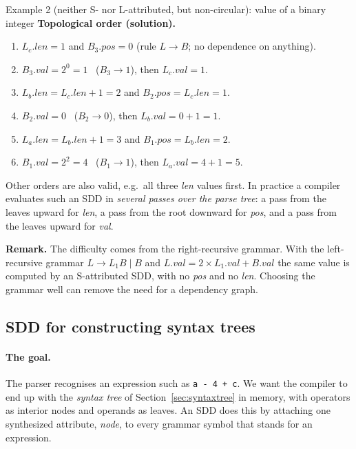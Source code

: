 \documentclass[11pt,a4paper]{article}
\newcommand{\at}[2]{\ensuremath{#1.\mathit{#2}}}
\begin{document}
\begin{examplebox}{Example 2 (neither S- nor L-attributed, but non-circular): value of a binary integer}
\textbf{Topological order (solution).}
\begin{enumerate}[nosep,label=(\arabic*)]
\item $\at{L_c}{len}=1$ and $\at{B_3}{pos}=0$ (rule $L\to B$; no dependence on anything).
\item $\at{B_3}{val}=2^{0}=1$ \ ($B_3\to1$), then $\at{L_c}{val}=1$.
\item $\at{L_b}{len}=\at{L_c}{len}+1=2$ and $\at{B_2}{pos}=\at{L_c}{len}=1$.
\item $\at{B_2}{val}=0$ \ ($B_2\to0$), then $\at{L_b}{val}=0+1=1$.
\item $\at{L_a}{len}=\at{L_b}{len}+1=3$ and $\at{B_1}{pos}=\at{L_b}{len}=2$.
\item $\at{B_1}{val}=2^{2}=4$ \ ($B_1\to1$), then $\at{L_a}{val}=4+1=5$.
\end{enumerate}
Other orders are also valid, e.g.\ all three \textit{len} values first. In practice a compiler evaluates such an SDD in \emph{several passes over the parse tree}: a pass from the leaves upward for \textit{len}, a pass from the root downward for \textit{pos}, and a pass from the leaves upward for \textit{val}.

\textbf{Remark.} The difficulty comes from the right-recursive grammar. With the left-recursive grammar $L\to L_1B\mid B$ and $\at{L}{val}=2\times\at{L_1}{val}+\at{B}{val}$ the same value is computed by an S-attributed SDD, with no \textit{pos} and no \textit{len}. Choosing the grammar well can remove the need for a dependency graph.
\end{examplebox}

\subsection{SDD for constructing syntax trees}
\label{sec:sddtree}

\paragraph{The goal.} The parser recognises an expression such as \texttt{a - 4 + c}. We want the compiler to end up with the \emph{syntax tree} of Section~\ref{sec:syntaxtree} in memory, with operators as interior nodes and operands as leaves. An SDD does this by attaching one synthesized attribute, \textit{node}, to every grammar symbol that stands for an expression.
\end{document}
